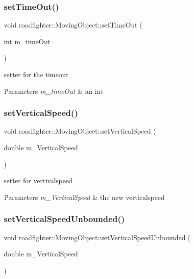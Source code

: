 \subsubsection{\texorpdfstring{set\+Time\+Out()}{setTimeOut()}}
{\footnotesize\ttfamily void roadfighter\+::\+Moving\+Object\+::set\+Time\+Out (\begin{DoxyParamCaption}\item[{int}]{m\+\_\+time\+Out }\end{DoxyParamCaption})}

setter for the timeout 
\begin{DoxyParams}{Parameters}
{\em m\+\_\+time\+Out} & an int \\
\hline
\end{DoxyParams}
\mbox{\label{classroadfighter_1_1MovingObject_a7382aeb5c2e7254dde2cc571c85a8fbb}} 
\subsubsection{\texorpdfstring{set\+Vertical\+Speed()}{setVerticalSpeed()}}
{\footnotesize\ttfamily void roadfighter\+::\+Moving\+Object\+::set\+Vertical\+Speed (\begin{DoxyParamCaption}\item[{double}]{m\+\_\+\+Vertical\+Speed }\end{DoxyParamCaption})}

setter for vertivalspeed 
\begin{DoxyParams}{Parameters}
{\em m\+\_\+\+Vertical\+Speed} & the new verticalspeed \\
\hline
\end{DoxyParams}
\mbox{\label{classroadfighter_1_1MovingObject_a9aa56ab17060aabcae8604633993323f}} 
\subsubsection{\texorpdfstring{set\+Vertical\+Speed\+Unbounded()}{setVerticalSpeedUnbounded()}}
{\footnotesize\ttfamily void roadfighter\+::\+Moving\+Object\+::set\+Vertical\+Speed\+Unbounded (\begin{DoxyParamCaption}\item[{double}]{m\+\_\+\+Vertical\+Speed }\end{DoxyParamCaption})}

